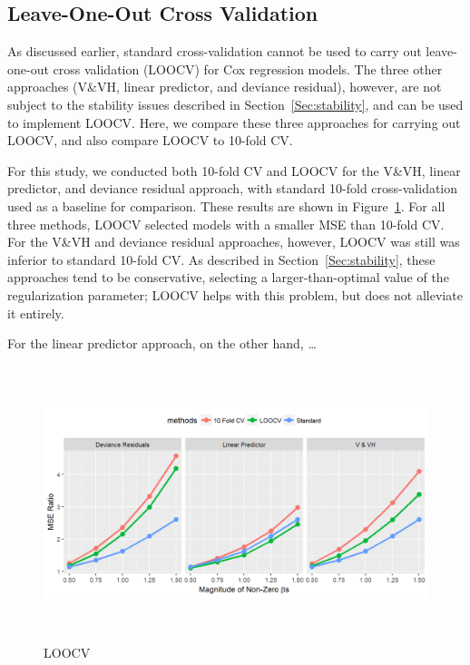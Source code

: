 \subsection {Leave-One-Out Cross Validation }
\label{Sec:loocv}

As discussed earlier, standard cross-validation cannot be used to carry out leave-one-out cross validation (LOOCV) for Cox regression models.  The three other approaches (V\&VH, linear predictor, and deviance residual), however, are not subject to the stability issues described in Section~\ref{Sec:stability}, and can be used to implement LOOCV.  Here, we compare these three approaches for carrying out LOOCV, and also compare LOOCV to 10-fold CV.

For this study, we conducted both 10-fold CV and LOOCV for the V\&VH, linear predictor, and deviance residual approach, with standard 10-fold cross-validation used as a baseline for comparison.  These results are shown in Figure~\ref{Fig:loocv}.  For all three methods, LOOCV selected models with a smaller MSE than 10-fold CV. For the V\&VH and deviance residual approaches, however, LOOCV was still was inferior to standard 10-fold CV.  As described in Section~\ref{Sec:stability}, these approaches tend to be conservative, selecting a larger-than-optimal value of the regularization parameter; LOOCV helps with this problem, but does not alleviate it entirely.

For the linear predictor approach, on the other hand, \ldots {}

\begin{figure}[h]
  \centering
  \includegraphics[height= 8cm ]{./figures/figure_4.png}
  \caption{\label{Fig:loocv}LOOCV}
\end{figure}	

